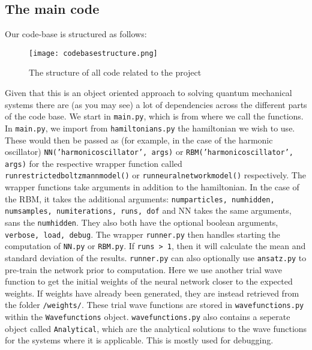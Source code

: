\documentclass[12pt]{article}
\begin{document}
{\subsection{The main code}
Our code-base is structured as follows:
\begin{figure}[ht!]
    \centering
    \texttt{[image: codebasestructure.png]}
    \caption{The structure of all code related to the project}
    \label{fig:code}
\end{figure}
\newline
Given that this is an object oriented approach to solving quantum mechanical systems there are (as you may see) a lot of dependencies across the different parts of the code base. \newline
We start in \texttt{main.py}, which is from where we call the functions. In \texttt{main.py}, we import from \texttt{hamiltonians.py} the hamiltonian we wish to use. These would then be passed as (for example, in the case of the harmonic oscillator) \texttt{NN('harmonic\textunderscore oscillator', args)} or \texttt{RBM('harmonic\textunderscore oscillator', args)} for the respective wrapper function called \texttt{run\textunderscore restricted\textunderscore boltzmann\textunderscore model()} or \newline  \texttt{run\textunderscore neural\textunderscore network\textunderscore model()} respectively. \newline
The wrapper functions take arguments in addition to the hamiltonian. In the case of the RBM, it takes the additional arguments: \texttt{num\textunderscore particles, num\textunderscore hidden, num\textunderscore samples, num\textunderscore iterations, runs, dof} and NN takes the same arguments, sans the \texttt{num\textunderscore hidden}. They also both have the optional boolean arguments, \texttt{verbose, load, debug}.
\newline
The wrapper \texttt{runner.py} then handles starting the computation of \texttt{NN.py} or \texttt{RBM.py}. If \texttt{runs > 1}, then it will calculate the mean and standard deviation of the results. \texttt{runner.py} can also optionally use \texttt{ansatz.py} to pre-train the network prior to computation. Here we use another trial wave function to get the initial weights of the neural network closer to the expected weights. If weights have already been generated, they are instead retrieved from the folder \texttt{/weights/}. These trial wave functions are stored in \texttt{wavefunctions.py} within the \texttt{Wavefunctions} object. \texttt{wavefunctions.py} also contains a seperate object called \texttt{Analytical}, which are the analytical solutions to the wave functions for the systems where it is applicable. This is mostly used for debugging. \newline
}
\end{document}
